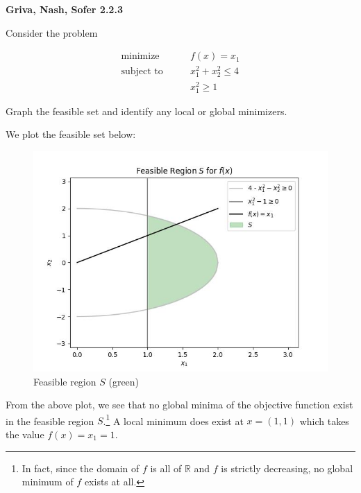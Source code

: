 \textbf{Griva, Nash, Sofer 2.2.3}

Consider the problem

\begin{align*}
  \text{minimize}   \qquad & f(x) = x_1 \\
  \text{subject to} \qquad & x_1^2 + x_2^2 \le 4 \\
                    \qquad & x_1^2 \ge 1
\end{align*}

Graph the feasible set and identify any local or global minimizers.

\begin{solution}
  We plot the feasible set below:

  \begin{figure}[h]
    \centering
    \includegraphics[width=\textwidth]{problem_2.jpg}
    \caption{Feasible region $S$ (green)}
  \end{figure}

  From the above plot, we see that no global minima of the objective function exist in the feasible region $S$.\footnote{
    In fact, since the domain of $f$ is all of $\mathbb{R}$ and $f$ is strictly decreasing, no global minimum of $f$ exists at all.
  } 
  A local minimum does exist at $x = (1, 1)$ which takes the value $f(x) = x_1 = 1$.
  \ \\
\end{solution}